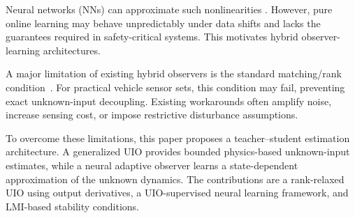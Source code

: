 \documentclass{ifacconf}
\begin{document}
Neural networks (NNs) can approximate such nonlinearities \citep{2006Apdat,HO_GP}. However, pure online learning may behave unpredictably under data shifts and lacks the guarantees required in safety-critical systems. This motivates hybrid observer-learning architectures.

A major limitation of existing hybrid observers is the standard matching/rank condition~\citep{Trinh:TAC08,chaouche2022unknown}. For practical vehicle sensor sets, this condition may fail, preventing exact unknown-input decoupling. Existing workarounds often amplify noise, increase sensing cost, or impose restrictive disturbance assumptions.

To overcome these limitations, this paper proposes a teacher--student estimation architecture. A generalized UIO provides bounded physics-based unknown-input estimates, while a neural adaptive observer learns a state-dependent approximation of the unknown dynamics. The contributions are a rank-relaxed UIO using output derivatives, a UIO-supervised neural learning framework, and LMI-based stability conditions.







\end{document}
